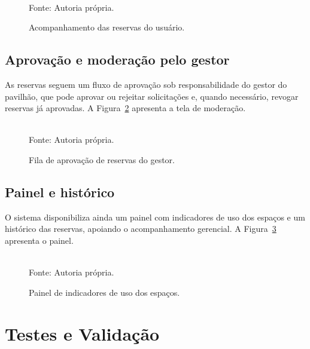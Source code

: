 \begin{figure}[H]
  \centering
  \framebox[0.9\textwidth]{\rule{0pt}{6cm}}%
  \caption{Acompanhamento das reservas do usuário.}
  \label{fig:minhas-reservas}\\
  {\footnotesize Fonte: Autoria própria.}
\end{figure}

\subsection{Aprovação e moderação pelo gestor}\label{subsec:demo-aprovacao}

As reservas seguem um fluxo de aprovação sob responsabilidade do gestor do pavilhão, que pode aprovar ou rejeitar solicitações e, quando necessário, revogar reservas já aprovadas. A Figura~\ref{fig:aprovacoes} apresenta a tela de moderação.

\begin{figure}[H]
  \centering
  \framebox[0.9\textwidth]{\rule{0pt}{6cm}}%
  \caption{Fila de aprovação de reservas do gestor.}
  \label{fig:aprovacoes}\\
  {\footnotesize Fonte: Autoria própria.}
\end{figure}

\subsection{Painel e histórico}\label{subsec:demo-dashboard}

O sistema disponibiliza ainda um painel com indicadores de uso dos espaços e um histórico das reservas, apoiando o acompanhamento gerencial. A Figura~\ref{fig:dashboard} apresenta o painel.

\begin{figure}[H]
  \centering
  \framebox[0.9\textwidth]{\rule{0pt}{7cm}}%
  \caption{Painel de indicadores de uso dos espaços.}
  \label{fig:dashboard}\\
  {\footnotesize Fonte: Autoria própria.}
\end{figure}

\section{Testes e Validação}\label{sec:testes}

